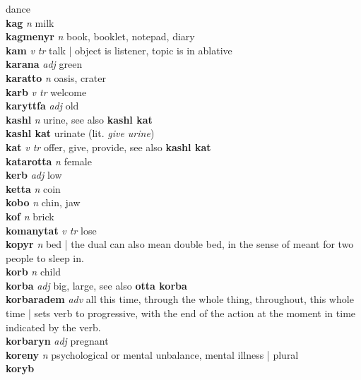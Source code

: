 dance\\\textbf{kag}   \emph{n} \textperiodcentered milk\\\textbf{kagmenyr}   \emph{n} \textperiodcentered book, booklet, notepad, diary\\\textbf{kam}   \emph{v tr} \textperiodcentered talk | object is listener, topic is in ablative\\\textbf{karana}   \emph{adj} \textperiodcentered green\\\textbf{karatto}   \emph{n} \textperiodcentered oasis, crater\\\textbf{karb}   \emph{v tr} \textperiodcentered welcome\\\textbf{karyttfa}   \emph{adj} \textperiodcentered old\\\textbf{kashl}   \emph{n} \textperiodcentered urine, see also \textbf{kashl kat}\\\textbf{kashl kat}    \textperiodcentered urinate (lit. \emph{give urine})\\\textbf{kat}   \emph{v tr} \textperiodcentered offer, give, provide, see also \textbf{kashl kat}\\\textbf{katarotta}   \emph{n} \textperiodcentered female\\\textbf{kerb}   \emph{adj} \textperiodcentered low\\\textbf{ketta}   \emph{n} \textperiodcentered coin\\\textbf{kobo}   \emph{n} \textperiodcentered chin, jaw\\\textbf{kof}   \emph{n} \textperiodcentered brick\\\textbf{komanytat}   \emph{v tr} \textperiodcentered lose\\\textbf{kopyr}   \emph{n} \textperiodcentered bed | the dual can also mean double bed, in the sense of meant for two people to sleep in.\\\textbf{korb}   \emph{n} \textperiodcentered child\\\textbf{korba}   \emph{adj} \textperiodcentered big, large, see also \textbf{otta korba}\\\textbf{korbaradem}   \emph{adv} \textperiodcentered all this time, through the whole thing, throughout, this whole time | sets verb to progressive, with the end of the action at the moment in time indicated by the verb.\\\textbf{korbaryn}   \emph{adj} \textperiodcentered pregnant\\\textbf{koreny}   \emph{n} \textperiodcentered psychological or mental unbalance, mental illness | plural\\\textbf{koryb} 